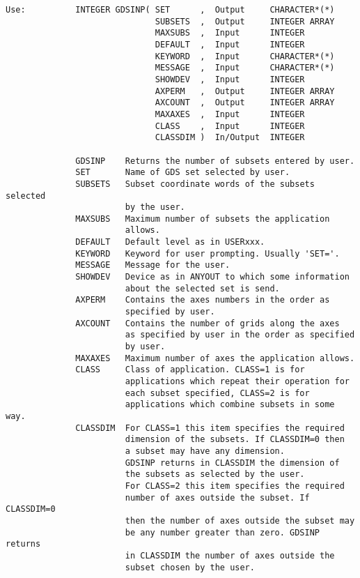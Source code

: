 \begin{verbatim}
Use:          INTEGER GDSINP( SET      ,  Output     CHARACTER*(*)
                              SUBSETS  ,  Output     INTEGER ARRAY
                              MAXSUBS  ,  Input      INTEGER
                              DEFAULT  ,  Input      INTEGER
                              KEYWORD  ,  Input      CHARACTER*(*)
                              MESSAGE  ,  Input      CHARACTER*(*)
                              SHOWDEV  ,  Input      INTEGER
                              AXPERM   ,  Output     INTEGER ARRAY
                              AXCOUNT  ,  Output     INTEGER ARRAY
                              MAXAXES  ,  Input      INTEGER
                              CLASS    ,  Input      INTEGER
                              CLASSDIM )  In/Output  INTEGER

              GDSINP    Returns the number of subsets entered by user.
              SET       Name of GDS set selected by user.
              SUBSETS   Subset coordinate words of the subsets selected
                        by the user.
              MAXSUBS   Maximum number of subsets the application
                        allows.
              DEFAULT   Default level as in USERxxx.
              KEYWORD   Keyword for user prompting. Usually 'SET='.
              MESSAGE   Message for the user.
              SHOWDEV   Device as in ANYOUT to which some information
                        about the selected set is send.
              AXPERM    Contains the axes numbers in the order as
                        specified by user.
              AXCOUNT   Contains the number of grids along the axes
                        as specified by user in the order as specified
                        by user.
              MAXAXES   Maximum number of axes the application allows.
              CLASS     Class of application. CLASS=1 is for
                        applications which repeat their operation for
                        each subset specified, CLASS=2 is for
                        applications which combine subsets in some way.
              CLASSDIM  For CLASS=1 this item specifies the required
                        dimension of the subsets. If CLASSDIM=0 then
                        a subset may have any dimension.
                        GDSINP returns in CLASSDIM the dimension of
                        the subsets as selected by the user.
                        For CLASS=2 this item specifies the required
                        number of axes outside the subset. If CLASSDIM=0
                        then the number of axes outside the subset may
                        be any number greater than zero. GDSINP returns
                        in CLASSDIM the number of axes outside the
                        subset chosen by the user.
\end{verbatim}

